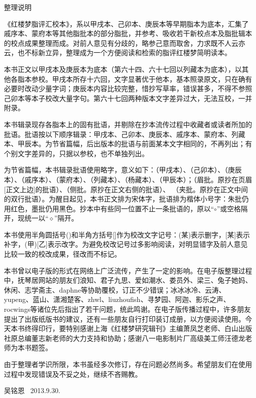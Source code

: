 \newpage

\begin{center}
{\Huge \heiti 整理说明}
\end{center}



《红楼梦脂评汇校本》，系以甲戌本、己卯本、庚辰本等早期脂本为底本，汇集了戚序本、蒙府本等其他脂批本的部分脂批，并参考、吸收若干新校点本及脂批辑本的校点成果整理而成。对前人意见有分歧的，略参己意而取舍，力求既不人云亦云，也不标新立异，整理成为一个方便阅读和检索的脂评红楼梦简明读本。

本书正文以甲戌本及庚辰本为底本（第六十四、六十七回以列藏本为底本），以其他各脂本参校。甲戌本所存十六回，文字显著优于他本，基本照录原文，只在确有必要时改动少量字词；庚辰本内容比较完整，惜抄写草率，错误甚多，不得不参照己卯本等本子校改大量字句。第六十七回两种版本文字差异过大，无法互校，一并附录。

本书辑录现存各脂本上的固有批语，并剔除在抄本流传过程中收藏者或读者所加的批语。批语按以下顺序辑录：甲戌本、己卯本、庚辰本、戚序本、蒙府本、列藏本、甲辰本。为节省篇幅，后出版本的批语与前面某本文字相同的，不再列出；有个别文字差异的，只据以参校，也不单独列出。

为节省篇幅，本书辑录批语使用略字，意义如下：（甲戌本）、（己卯本）、（庚辰本）、（戚序本）、（蒙府本）、（列藏本）、（杨藏本）、（甲辰本）；（眉批。原抄在页眉{[}正文上边{]}的批语）、（侧批。原抄在正文右侧的批语）、 （夹批。原抄在正文中间的双行批语）。为醒目起见，本书正文排为宋体字，批语排为楷体小号字：朱批仍用红色，墨批仍用黑色。抄本中有些同一位置不止一条批语的，原以“{$\circ$}”或空格隔开，现统一以“{$\diamond$}”隔开。

本书使用半角圆括号()和半角方括号{[}{]}作为校改文字记号：(某)表示删字，{[}某{]}表示补字，(甲){[}乙{]}表示改字。为避免校改记号过多影响阅读，对明显错字及前人意见比较一致的校改成果，径改而不标记。

本书曾以电子版的形式在网络上广泛流传，产生了一定的影响。在电子版整理过程中，抚琴居网站的朋友们浪知、君子九思、爱如潮水、娄员外、梁三、兔子她妈、休闲、志学斋主、daphne等协助覆校，订正不少错误；冰冰冰冷、云涛、yupeng、蓝山、潇湘楚客、zhwl、liuzhoufish、寻梦园、阿迦、影乐之声、rocwings等诸位先后指出了若干问题，统此鸣谢。在电子版传播过程中，许多朋友提出了出版纸版书的建议，还有一些朋友自行打印装订成册，以方便阅读使用。今天本书终得印行，要特别感谢上海《红楼梦研究辑刊》主编萧凤芝老师、白山出版社原总编董志新老师的大力支持和协助；感谢八一电影制片厂高级美工师汪德龙老师为本书题签。

由于整理者学识所限，本书虽经多次修订，存在问题必然尚多。希望朋友们在使用过程中发现错误及不妥之处，继续不吝赐教。

\begin{flushright}
	吴铭恩 ~2013.9.30.
\end{flushright}~~~~
